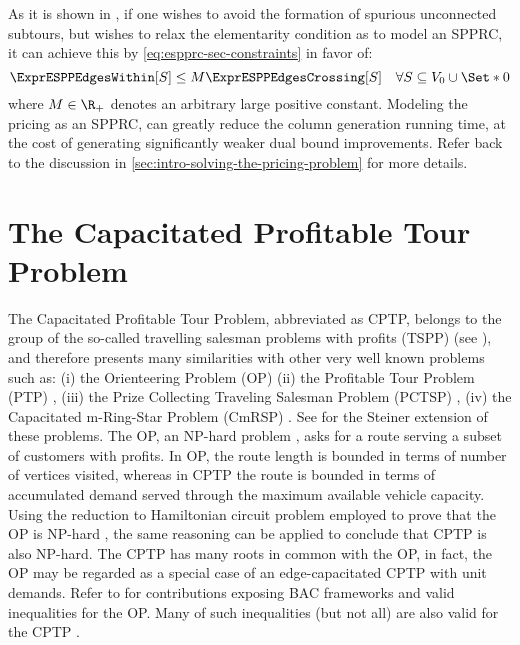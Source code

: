 As it is shown in \textcite{beasley1989},
if one wishes to avoid the formation of spurious unconnected subtours,
but wishes to relax the elementarity condition as to model an SPPRC,
it can achieve this by \cref{eq:espprc-sec-constraints} in favor of:
\begin{equation}
	\ExprESPPEdgesWithin[S] \le M \ExprESPPEdgesCrossing[S] \quad \forall S \subseteq V_0 \cup \Set*{0}
\end{equation}
where $M \in \R_+$ denotes an arbitrary large positive constant.
Modeling the pricing as an SPPRC, can greatly reduce
the column generation running time, at the cost
of generating significantly weaker dual bound improvements.
Refer back to the discussion in \cref{sec:intro-solving-the-pricing-problem}
for more details.

\section{The Capacitated Profitable Tour Problem}
\label{sec:the-capacitated-profitable-tour-problem}

The Capacitated Profitable Tour Problem, abbreviated as CPTP,
belongs to the group of the so-called travelling salesman
problems with profits (TSPP) (see \cite{feillet2005}),
and therefore presents many similarities with other very well known
problems such as:
(i) the Orienteering Problem (OP) \parencite{golden1987, laporte1990}
(ii) the Profitable Tour Problem (PTP) \parencite{dellamico1995},
(iii) the Prize Collecting Traveling Salesman Problem (PCTSP) \parencite{balas1989prize, balas1995prize},
(iv) the Capacitated m-Ring-Star Problem (CmRSP) \parencite{baldacci2007capacitated}.
See \textcite{letchford2013} for the Steiner extension of these problems.
The OP, an NP-hard problem \parencite{laporte1990}, asks for a route serving
a subset of customers with profits.
In OP, the route length is bounded in terms of number of vertices visited,
whereas in CPTP the route is bounded in terms of accumulated demand served
through the maximum available vehicle capacity.
Using the reduction to Hamiltonian circuit problem
employed to prove that the OP is NP-hard \parencite{laporte1990},
the same reasoning can be applied to conclude that CPTP is also NP-hard.
The CPTP has many roots in common with the OP, in fact,
the OP may be regarded as a special case of an edge-capacitated CPTP with unit demands.
Refer to \textcite{fischetti1998, gendreau1998} for contributions
exposing BAC frameworks and valid inequalities for the OP.
Many of such inequalities (but not all) are also valid for the CPTP \parencite{jepsen2014}.

